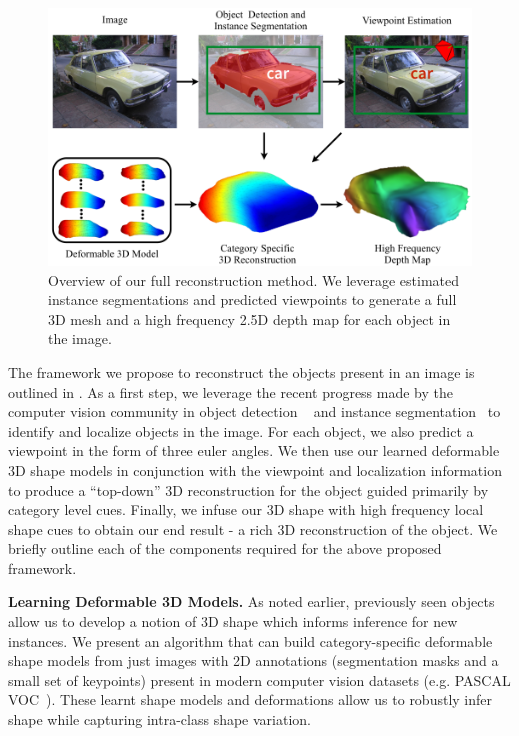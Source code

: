 \begin{figure}[t]
\centering
\includegraphics[width = \textwidth]{figures/categoryshapes/figTest.pdf}
\caption{Overview of our full reconstruction method. We leverage estimated instance segmentations and predicted viewpoints to generate a full 3D mesh and a high frequency 2.5D depth map for each object in the image.}
\end{figure}

The framework we propose to reconstruct the objects present in an image is outlined in . As a first step, we leverage the recent progress made by the computer vision community in object detection ~\cite{rcnn} and instance segmentation~\cite{BharathECCV2014, BharathCVPR2015} to identify and localize objects in the image. For each object, we also predict a viewpoint in the form of three euler angles. We then use our learned deformable 3D shape models in conjunction with the viewpoint and localization information to produce a ``top-down'' 3D reconstruction for the object guided primarily by category level cues. Finally, we infuse our 3D shape with high frequency local shape cues to obtain our end result - a rich 3D reconstruction of the object. We briefly outline each of the components required for the above proposed framework.

\vspace{2mm}
\noindent \textbf{Learning Deformable 3D Models.}
As noted earlier, previously seen objects allow us to develop a notion of 3D shape which informs inference for new instances. We present an algorithm that can build category-specific  deformable shape models from just images with 2D annotations (segmentation masks and a small set of keypoints) present in modern computer vision datasets (e.g. PASCAL VOC~\cite{pascal-voc-2012}). These learnt shape models and deformations allow us to robustly infer shape while capturing intra-class shape variation.

